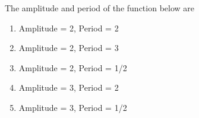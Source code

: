 \bigskip

\item The amplitude and period of the function below are


    \begin{minipage}{0.4\columnwidth}
        \begin{enumerate}
            \item Amplitude = 2, Period = 2
            \item Amplitude = 2, Period = 3
            \item Amplitude = 2, Period = 1/2
            \item Amplitude = 3, Period = 2
            \item Amplitude = 3, Period = 1/2
        \end{enumerate}
    \end{minipage}
\begin{minipage}{0.6\columnwidth}
\end{minipage}

